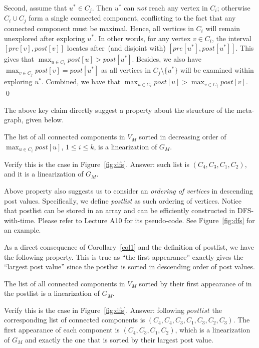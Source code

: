 Second, assume that $u^* \in C_j$. Then $u^*$ can \emph{not} reach any vertex in $C_i$; otherwise
$C_i\cup C_j$ form a single connected component, conflicting to the fact that any connected component must be maximal.
Hence, all vertices in $C_i$ will remain unexplored after exploring $u^*$.
In other words, for any vertex $v\in C_i$, the interval $[pre[v], post[v]]$
locates after~(and disjoint with) $[pre[u^*], post[u^*]]$. This gives that
$\max_{u\in C_i} post[u] > post[u^*]$. Besides, 
we also have $\max_{v\in C_j} post[v] = post[u^*]$ as all vertices in $C_j\setminus \{u^*\}$ will be examined within exploring $u^*$.
Combined, we have that $\max_{u\in C_i} post[u] > \max_{v\in C_j} post[v]$.
\qed

The above key claim directly suggest a property about the structure of the meta-graph, given below.

\begin{corollary}
The list of all connected components in $V_M$ sorted in decreasing order of $\max_{u\in C_i} post[u]$, $1\le i \le k$,
is a linearization of $G_M$.
\label{col1}
\end{corollary}

Verify this is the case in Figure~\ref{fig:dfs}. Answer: such list is $(C_4, C_3, C_1, C_2)$, and it is a linearization of $G_M$.

Above property also suggests us to consider an \emph{ordering of vertices} in descending post values.
Specifically, we define \emph{postlist} as such ordering of vertices.
Notice that postlist can be stored in an array and can be efficiently constructed in DFS-with-time.
Please refer to Lecture A10 for its pseudo-code.
See Figure~\ref{fig:dfs} for an example.

As a direct consequence of Corollary~\ref{col1} and the definition of postlist, we have the following property.
This is true as ``the first appearance'' exactly gives the ``largest post value'' since the postlist is sorted 
in descending order of post values.

\begin{corollary}
The list of all connected components in $V_M$
sorted by their first appearance of in the postlist is a linearization of $G_M$.
\label{col2}
\end{corollary}

Verify this is the case in Figure~\ref{fig:dfs}. Answer: following $postlist$ the corresponding list of 
connected components is $(C_4, C_4, C_3, C_1, C_3, C_2, C_3)$.
The first appearance of each component is $(C_4, C_3, C_1, C_2)$, which is a linearization of $G_M$
and exactly the one that is sorted by their largest post value.

